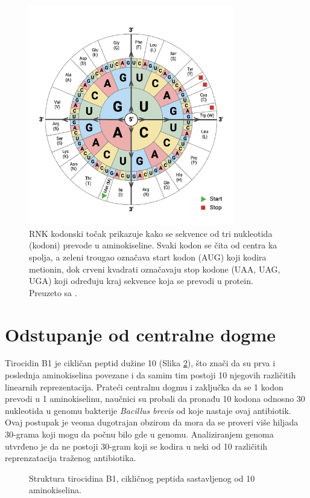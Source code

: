 \documentclass[12pt,oneside]{memoir}
\begin{document}
\begin{figure}[H]
  \centering
  \includegraphics[width=0.8\textwidth]{images/RNA-Codon-Wheel.png}
  \caption{RNK kodonski točak prikazuje kako se sekvence od tri nukleotida (kodoni) prevode u aminokiseline. Svaki kodon se čita od centra ka spolja, a zeleni trougao označava start kodon (AUG) koji kodira metionin, dok crveni kvadrati označavaju stop kodone (UAA, UAG, UGA) koji određuju kraj sekvence koja se prevodi u protein. Preuzeto sa \cite{codon_chart}.}
  \label{fig:codon-wheel}
\end{figure}


\section{Odstupanje od centralne dogme}
Tirocidin B1 je cikličan peptid dužine 10 (Slika \ref{fig:tirocidin}), što znači da su prva i poslednja aminokiselina povezane i da samim tim postoji 10 njegovih različitih linearnih reprezentacija. Prateći centralnu dogmu i zaključka da se 1 kodon prevodi u 1 aminokiselinu, naučnici su probali da pronađu 10 kodona odnosno 30 nukleotida u genomu bakterije \emph{Bacillus brevis} od koje nastaje ovaj antibiotik. Ovaj postupak je veoma dugotrajan obzirom da mora da se proveri više hiljada 30-grama koji mogu da počnu bilo gde u genomu. Analiziranjem genoma utvrđeno je da ne postoji 30-gram koji se kodira u neki od 10 različitih reprenzatacija traženog antibiotika.

\begin{figure}[h]
  \centering
  
  \caption{Struktura tirocidina B1, cikličnog peptida sastavljenog od 10 aminokiselina.}
  \label{fig:tirocidin}
\end{figure}
\end{document}
